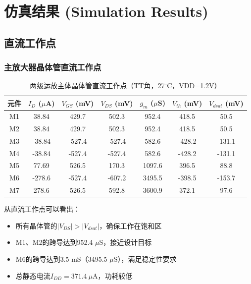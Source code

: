 \documentclass[UTF8,12pt,a4paper]{ctexart}
\begin{document}
\section{仿真结果 (Simulation Results)}

\subsection{直流工作点}

\subsubsection{主放大器晶体管直流工作点}

\begin{table}[h]
\centering
\caption{两级运放主体晶体管直流工作点（TT角，27$^\circ$C，VDD=1.2V）}
\small
\begin{tabular}{|c|c|c|c|c|c|c|}
\hline
\textbf{元件} & \textbf{$I_D$ ($\mu$A)} & \textbf{$V_{GS}$ (mV)} & \textbf{$V_{DS}$ (mV)} & \textbf{$g_m$ ($\mu$S)} & \textbf{$V_{th}$ (mV)} & \textbf{$V_{dsat}$ (mV)} \\
\hline
M1 & 38.84 & 429.7 & 502.3 & 952.4 & 418.5 & 50.5 \\
M2 & 38.84 & 429.7 & 502.3 & 952.4 & 418.5 & 50.5 \\
M3 & -38.84 & -527.4 & -527.4 & 582.6 & -428.2 & -131.1 \\
M4 & -38.84 & -527.4 & -527.4 & 582.6 & -428.2 & -131.1 \\
M5 & 77.69 & 526.5 & 170.3 & 1097.6 & 396.5 & 88.8 \\
M6 & -278.6 & -527.4 & -607.2 & 3495.5 & -398.5 & -153.7 \\
M7 & 278.6 & 526.5 & 592.8 & 3600.9 & 372.1 & 97.6 \\
\hline
\end{tabular}
\end{table}

从直流工作点可以看出：
\begin{itemize}
    \item 所有晶体管的$|V_{DS}| > |V_{dsat}|$，确保工作在饱和区
    \item M1、M2的跨导达到952.4 $\mu$S，接近设计目标
    \item M6的跨导达到3.5 mS（3495.5 $\mu$S），满足稳定性要求
    \item 总静态电流$I_{DD} = 371.4\ \mu$A，功耗较低
\end{itemize}
\end{document}
